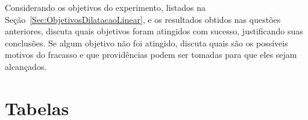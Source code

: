 \begin{question}[type={exam}]{2}
Considerando os objetivos do experimento, listados na Seção~\ref{Sec:ObjetivosDilatacaoLinear}, e os resultados obtidos nas questões anteriores, discuta quais objetivos foram atingidos com sucesso, justificando suas conclusões. Se algum objetivo não foi atingido, discuta quais são os possíveis motivos do fracasso e que providências podem ser tomadas para que eles sejam alcançados.
\end{question}

\vfill
\pagebreak
\section{Tabelas}
